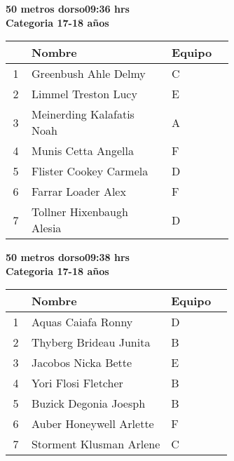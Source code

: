 \begin{minipage}{0.95\linewidth}\vspace{0.5cm} 
\begin{flushleft}
\textbf{
\hspace{-0.15cm}50 metros dorso\hspace{1.5cm}09:36 hrs \\Categoria 17-18 años}\vspace{-0.2cm} 
\end{flushleft}
\begin{tabular}{cp{0.63\linewidth}l}
\hline
& \textbf{Nombre} & \textbf{Equipo} \\ \hline
1 & Greenbush Ahle Delmy & C \\ 
2 & Limmel Treston Lucy & E \\ 
3 & Meinerding Kalafatis Noah & A \\ 
4 & Munis Cetta Angella & F \\ 
5 & Flister Cookey Carmela & D \\ 
6 & Farrar Loader Alex & F \\ 
7 & Tollner Hixenbaugh Alesia & D \\ 
\end{tabular}
\end{minipage}
\begin{minipage}{0.95\linewidth}\vspace{0.5cm} 
\begin{flushleft}
\textbf{
\hspace{-0.15cm}50 metros dorso\hspace{1.5cm}09:38 hrs \\Categoria 17-18 años}\vspace{-0.2cm} 
\end{flushleft}
\begin{tabular}{cp{0.63\linewidth}l}
\hline
& \textbf{Nombre} & \textbf{Equipo} \\ \hline
1 & Aquas Caiafa Ronny & D \\ 
2 & Thyberg Brideau Junita & B \\ 
3 & Jacobos Nicka Bette & E \\ 
4 & Yori Flosi Fletcher & B \\ 
5 & Buzick Degonia Joesph & B \\ 
6 & Auber Honeywell Arlette & F \\ 
7 & Storment Klusman Arlene & C \\ 
\end{tabular}
\end{minipage}
